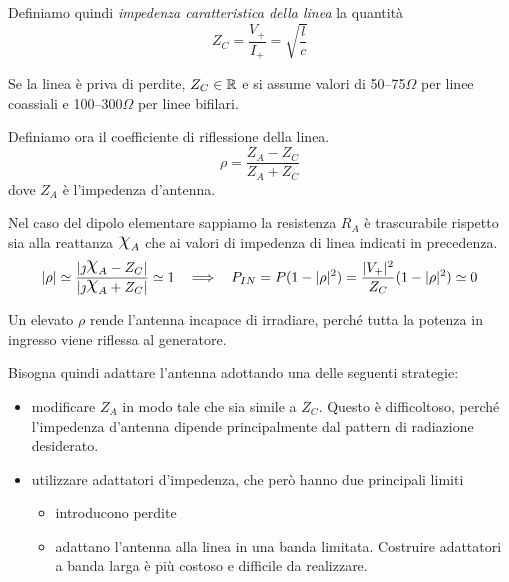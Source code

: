 Definiamo quindi \emph{impedenza caratteristica della linea} la quantità
\begin{equation}
	Z_C = \frac{V_+}{I_+} = \sqrt{\frac{l}{c}}
\end{equation}

Se la linea è priva di perdite, $Z_C \in \mathbb{R}$ e si assume valori di 50--75$\Omega$ per linee coassiali e 100--300$\Omega$ per linee bifilari.

Definiamo ora il coefficiente di riflessione della linea.
\begin{equation}
	\rho = \frac{Z_A -Z_C}{Z_A + Z_C}
\end{equation}
dove $Z_A$ è l'impedenza d'antenna.

Nel caso del dipolo elementare sappiamo la resistenza $R_A$ è trascurabile rispetto sia alla reattanza $\Chi_A$ che ai valori di impedenza di linea indicati in precedenza.
\begin{equation*}
	|\rho|
	\simeq \frac{|\jmath \Chi_A -Z_C|}{|\jmath \Chi_A +Z_C|}
	\simeq 1
	~~ \implies ~~
	P_{IN}
	= P(1-|\rho|^2)
	= \frac{|V_+|^2}{Z_C}(1-|\rho|^2) \simeq 0
\end{equation*}

Un elevato $\rho$ rende l'antenna incapace di irradiare, perché tutta la potenza in ingresso viene riflessa al generatore.

Bisogna quindi adattare l'antenna adottando una delle seguenti strategie:
\begin{itemize}
	\item modificare $Z_A$ in modo tale che sia simile a $Z_C$. Questo è difficoltoso, perché l'impedenza d'antenna dipende principalmente dal pattern di radiazione desiderato.
	\item utilizzare adattatori d'impedenza, che però hanno due principali limiti
	\begin{itemize}
		\item introducono perdite
		\item adattano l'antenna alla linea in una banda limitata. Costruire adattatori a banda larga è più costoso e difficile da realizzare.
	\end{itemize}
\end{itemize}



